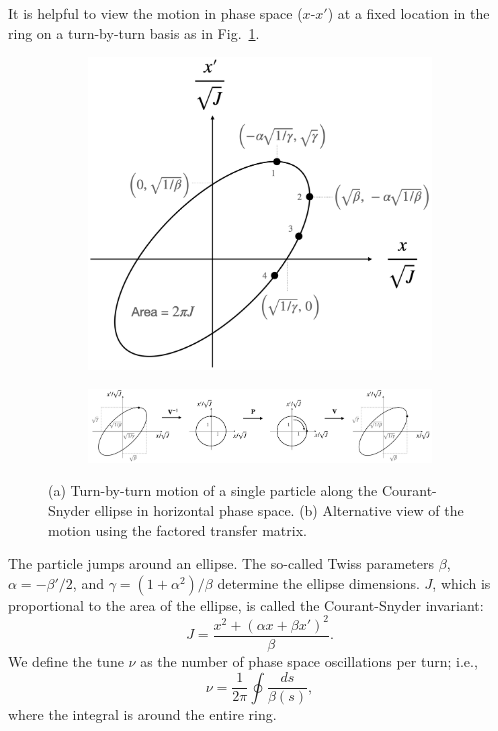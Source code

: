 It is helpful to view the motion in phase space ($x$-$x'$) at a fixed location in the ring on a turn-by-turn basis as in Fig.~\ref{fig:cs_ellipse_a}. 
%
\begin{figure}[!p]
    \centering
    \begin{subfigure}{0.6\textwidth}
        \includegraphics[width=\textwidth]{Images/chapter1/cs_ellipse.png}
        \caption{}
        \label{fig:cs_ellipse_a}
    \end{subfigure}
    \vfill
    \vspace*{1.5cm}
    \vfill
    \begin{subfigure}{\textwidth}
        \includegraphics[width=\textwidth]{Images/chapter1/norm_coords.png}
        \caption{}
        \label{fig:cs_ellipse_b}
    \end{subfigure}
    \caption{(a) Turn-by-turn motion of a single particle along the Courant-Snyder ellipse in horizontal phase space. (b) Alternative view of the motion using the factored transfer matrix.}
    \label{fig:cs_ellipse}
\end{figure}
%
The particle jumps around an ellipse. The so-called Twiss parameters $\beta$, $\alpha = -\beta' / 2$, and $\gamma = (1 + \alpha^2) / \beta$ determine the ellipse dimensions. $J$, which is proportional to the area of the ellipse, is called the Courant-Snyder invariant:
%
\begin{equation}\label{eq:CS invariant}
    J = \frac{x^2 + (\alpha x + \beta x')^2}{\beta}.
\end{equation}
%
We define the tune $\nu$ as the number of phase space oscillations per turn; i.e.,
%
\begin{equation}
    \nu = \frac{1}{2\pi}\oint{\frac{ds}{\beta(s)}},
\end{equation}
%
where the integral is around the entire ring.

